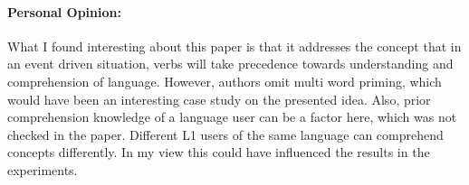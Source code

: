 \documentclass[12pt]{report}
\begin{document}
\vfill

\paragraph{Personal Opinion:} 
What I found interesting about this paper is that it addresses the concept that in an event driven situation, verbs will take precedence towards understanding and comprehension of language. However, authors omit multi word priming, which would have been an interesting case study on the presented idea. Also, prior comprehension knowledge of a language user can be a factor here, which was not checked in the paper. Different L1 users of the same language can comprehend concepts differently. In my view this could have influenced the results in the experiments.
\vfill
\end{document}
